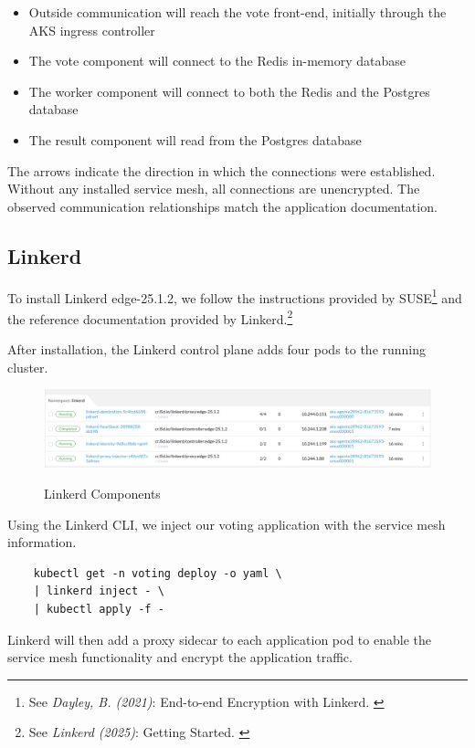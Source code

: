 \begin{itemize}
    \item Outside communication will reach the vote front-end, initially through the AKS ingress controller
    \item The vote component will connect to the Redis in-memory database
    \item The worker component will connect to both the Redis and the Postgres database
    \item The result component will read from the Postgres database
\end{itemize}

The arrows indicate the direction in which the connections were established. Without any installed service mesh, all connections are unencrypted. The observed communication relationships match the application documentation.

\subsection{Linkerd}

To install Linkerd edge-25.1.2, we follow the instructions provided by SUSE\footnote{See \textit{Dayley, B. (2021)}: End-to-end Encryption with Linkerd. \cite{installLinkerd}} and the reference documentation provided by Linkerd.\footnote{See \textit{Linkerd (2025)}: Getting Started. \cite{gettingStarted}}

After installation, the Linkerd control plane adds four pods to the running cluster.

\begin{figure}[H]
\centering
\caption {Linkerd Components}
\includegraphics[width=\linewidth]{images/linkerd-pods.png}
\label{fig:linkerdPods}
\end{figure}

Using the Linkerd CLI, we inject our voting application with the service mesh information.

\begin{verbatim}
    kubectl get -n voting deploy -o yaml \
    | linkerd inject - \
    | kubectl apply -f -
\end{verbatim}

Linkerd will then add a proxy sidecar to each application pod to enable the service mesh functionality and encrypt the application traffic.

